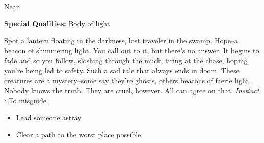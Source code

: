  Near


 \textbf{Special Qualities:}
 Body of light


 Spot a lantern floating in the darkness, lost traveler in the swamp. Hope--a beacon of shimmering light. You call out to it, but there's no answer. It begins to fade and so you follow, sloshing through the muck, tiring at the chase, hoping you're being led to safety. Such a sad tale that always ends in doom. These creatures are a mystery--some say they're ghosts, others beacons of faerie light. Nobody knows the truth. They are cruel, however. All can agree on that. \emph{Instinct}
: To misguide
\begin{itemize}
\item Lead someone astray
\item Clear a path to the worst place possible

\end{itemize}


